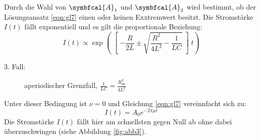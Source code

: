 Durch die Wahl von $\symbfcal{A}_1$ und $\symbfcal{A}_2$ wird bestimmt, ob der Lösungsansatz \eqref{eqn:gl7} einen oder keinen Exxtremwert besitzt.
Die Stromstärke $I(t)$ fällt exponentiell und es gilt die proportionale Beziehung:
\begin{equation}
  I(t) \propto \exp\left(\middle[-\frac{R}{2L} \pm \sqrt{\frac{R^2}{4L^2} - \frac{1}{LC}}\middle]t\right)
  \label{eqn:gl13}
\end{equation}
\begin{description}
  \item[3. Fall:] aperiodischer Grenzfall, $\frac{1}{LC} = \frac{R_{ap}^2}{4L^2}$
\end{description}
Unter dieser Bedingung ist $\nu = 0$ und Gleichung \eqref{eqn:gl7} vereinnfacht sich zu:
\begin{equation}
  I(t) = A_0 e^{-2\pi\mu t}
  \label{eqn:gl14}
\end{equation}
Die Stromstärke $I(t)$ fällt hier am schnellsten gegen Null ab ohne dabei überzuschwingen (siehe Abbildung \ref{fig:abb3}).

